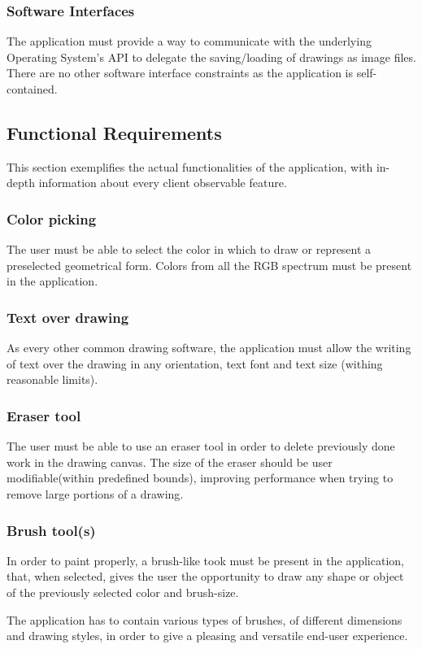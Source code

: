 \documentclass{article}
\begin{document}
\subsubsection{Software Interfaces}
The application must provide a way to communicate with the underlying Operating System's API to delegate the saving/loading of drawings as image files. There are no other software interface constraints as the application is self-contained.
\subsection{Functional Requirements}
This section exemplifies the actual functionalities of the application, with in-depth information about every client observable feature.
\subsubsection{Color picking}
The user must be able to select the color in which to draw or represent a preselected geometrical form. Colors from all the RGB spectrum must be present in the application.
\subsubsection{Text over drawing}
As every other common drawing software, the application must allow the writing of text over the drawing in any orientation, text font and text size (withing reasonable limits).
\subsubsection{Eraser tool}
The user must be able to use an eraser tool in order to delete previously done work in the drawing canvas. The size of the eraser should be user modifiable(within predefined bounds), improving performance when trying to remove large portions of a drawing.
\subsubsection{Brush tool(s)}
In order to paint properly, a brush-like took must be present in the application, that, when selected, gives the user the opportunity to draw any shape or object of the previously selected color and brush-size.

The application has to contain various types of brushes, of different dimensions and drawing styles, in order to give a pleasing and versatile end-user experience.
\end{document}

